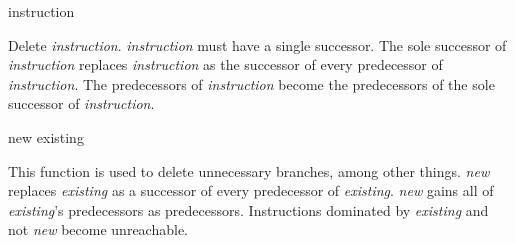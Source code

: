  {instruction}

Delete \textit{instruction}.  \textit{instruction} must have a single
successor.  The sole successor of \textit{instruction} replaces
\textit{instruction} as the successor of every predecessor of
\textit{instruction}.  The predecessors of \textit{instruction} become
the predecessors of the sole successor of \textit{instruction}.

 {new existing}

This function is used to delete unnecessary branches, among other things.
\textit{new} replaces \textit{existing} as a successor of every
predecessor of \textit{existing}. \textit{new} gains all of
\textit{existing}'s predecessors as predecessors.
Instructions dominated by \textit{existing} and not \textit{new} become
unreachable.

